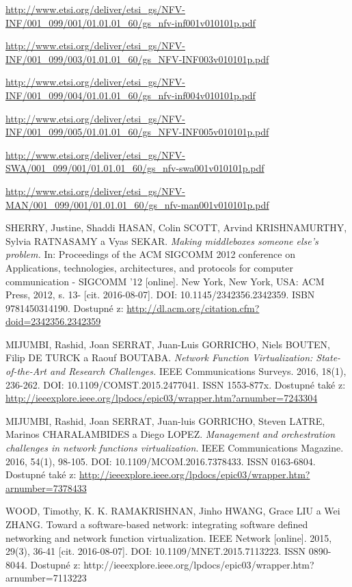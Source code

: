 \begin{thebibliography}{10}
\url{http://www.etsi.org/deliver/etsi_gs/NFV-INF/001_099/001/01.01.01_60/gs_nfv-inf001v010101p.pdf}

 \url{http://www.etsi.org/deliver/etsi_gs/NFV-INF/001_099/003/01.01.01_60/gs_NFV-INF003v010101p.pdf}

 \url{http://www.etsi.org/deliver/etsi_gs/NFV-INF/001_099/004/01.01.01_60/gs_nfv-inf004v010101p.pdf}

 \url{http://www.etsi.org/deliver/etsi_gs/NFV-INF/001_099/005/01.01.01_60/gs_NFV-INF005v010101p.pdf}

\url{http://www.etsi.org/deliver/etsi_gs/NFV-SWA/001_099/001/01.01.01_60/gs_nfv-swa001v010101p.pdf}

\url{http://www.etsi.org/deliver/etsi_gs/NFV-MAN/001_099/001/01.01.01_60/gs_nfv-man001v010101p.pdf}


SHERRY, Justine, Shaddi HASAN, Colin SCOTT, Arvind KRISHNAMURTHY, Sylvia RATNASAMY a Vyas SEKAR. \emph{Making middleboxes someone else's problem.} In: Proceedings of the ACM SIGCOMM 2012 conference on Applications, technologies, architectures, and protocols for computer communication - SIGCOMM '12 [online]. New York, New York, USA: ACM Press, 2012, s. 13- [cit. 2016-08-07]. DOI: 10.1145/2342356.2342359. ISBN 9781450314190. Dostupné z: \url{http://dl.acm.org/citation.cfm?doid=2342356.2342359}

MIJUMBI, Rashid, Joan SERRAT, Juan-Luis GORRICHO, Niels BOUTEN, Filip DE TURCK a Raouf BOUTABA. \emph{Network Function Virtualization: State-of-the-Art and Research Challenges.} IEEE Communications Surveys. 2016, 18(1), 236-262. DOI: 10.1109/COMST.2015.2477041. ISSN 1553-877x. Dostupné také z: \url{http://ieeexplore.ieee.org/lpdocs/epic03/wrapper.htm?arnumber=7243304}

MIJUMBI, Rashid, Joan SERRAT, Juan-luis GORRICHO, Steven LATRE, Marinos CHARALAMBIDES a Diego LOPEZ. \emph{Management and orchestration challenges in network functions virtualization}. IEEE Communications Magazine. 2016, 54(1), 98-105. DOI: 10.1109/MCOM.2016.7378433. ISSN 0163-6804. Dostupné také z: \url{http://ieeexplore.ieee.org/lpdocs/epic03/wrapper.htm?arnumber=7378433}

WOOD, Timothy, K. K. RAMAKRISHNAN, Jinho HWANG, Grace LIU a Wei ZHANG. Toward a software-based network: integrating software defined networking and network function virtualization. IEEE Network [online]. 2015, 29(3), 36-41 [cit. 2016-08-07]. DOI: 10.1109/MNET.2015.7113223. ISSN 0890-8044. Dostupné z: http://ieeexplore.ieee.org/lpdocs/epic03/wrapper.htm?arnumber=7113223


\end{thebibliography}
